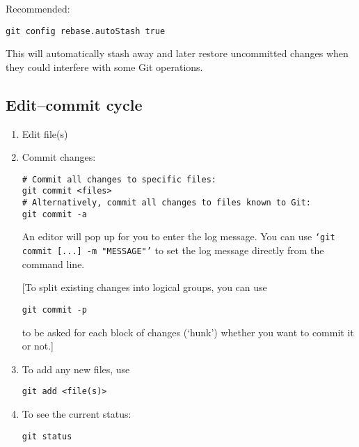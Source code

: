 \documentclass[12pt,pdftex]{article}
\begin{document}
Recommended:
\lstset{frame=single,basicstyle=\ttfamily\footnotesize,language=sh,label= ,caption= ,captionpos=b,numbers=none}
\begin{lstlisting}
git config rebase.autoStash true
\end{lstlisting}
This will automatically stash away and later restore uncommitted
changes when they could interfere with some Git operations.


\subsection{Edit–commit cycle}
\label{sec-2-4}

\begin{enumerate}
\item Edit file(s)

\item Commit changes:
\lstset{frame=single,basicstyle=\ttfamily\footnotesize,language=sh,label= ,caption= ,captionpos=b,numbers=none}
\begin{lstlisting}
# Commit all changes to specific files: 
git commit <files>
# Alternatively, commit all changes to files known to Git:
git commit -a
\end{lstlisting}

An editor will pop up for you to enter the log message.
You can use \texttt{‘git commit [...] -m "MESSAGE"’} to set the log message
directly from the command line.

[To split existing changes into logical groups, you can use
\lstset{frame=single,basicstyle=\ttfamily\footnotesize,language=sh,label= ,caption= ,captionpos=b,numbers=none}
\begin{lstlisting}
git commit -p
\end{lstlisting}
to be asked for each block of changes (‘hunk’) whether you want to
commit it or not.]

\item To add any new files, use
\lstset{frame=single,basicstyle=\ttfamily\footnotesize,language=sh,label= ,caption= ,captionpos=b,numbers=none}
\begin{lstlisting}
git add <file(s)>
\end{lstlisting}

\item To see the current status:
\lstset{frame=single,basicstyle=\ttfamily\footnotesize,language=sh,label= ,caption= ,captionpos=b,numbers=none}
\begin{lstlisting}
git status
\end{lstlisting}


\end{enumerate}
\end{document}
